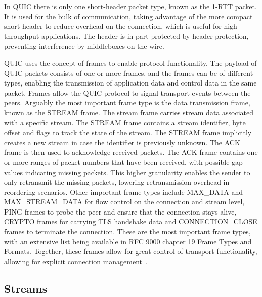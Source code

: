 \documentclass[english, 12pt, a4paper, elec, utf8, a-2b, online]{aaltothesis}
\begin{document}
In QUIC there is only one short-header packet type, known as the 1-RTT packet. It is
used for the bulk of communication, taking advantage of the more compact short
header to reduce overhead on the connection, which is useful for high-throughput
applications. The header is in part protected by header protection, preventing
interference by middleboxes on the wire.

QUIC uses the concept of frames to enable protocol functionality. The payload of
QUIC packets consists of one or more frames, and the frames can be of different types,
enabling the transmission of application data and control data in the same packet. Frames
allow the QUIC protocol to signal transport events between the peers. Arguably the most
important frame type is the data transmission frame, known as the STREAM frame. The stream frame
carries stream data associated with a specific stream. The STREAM frame contains
a stream identifier, byte offset and flags to track the state of the stream. The STREAM
frame implicitly creates a new stream in case the identifier is previously unknown.
The ACK frame is then used to acknowledge received packets. The ACK frame contains
one or more ranges of packet numbers that have been received, with possible gap values
indicating missing packets. This higher granularity enables the sender to only retransmit
the missing packets, lowering retransmission overhead in reordering scenarios. Other
important frame types include MAX\_DATA and MAX\_STREAM\_DATA for flow control
on the connection and stream level, PING frames to probe the peer and ensure that
the connection stays alive, CRYPTO frames for carrying TLS handshake data and CONNECTION\_CLOSE frames
to terminate the connection. These are the most important frame types, with an
extensive list being available in RFC 9000 chapter 19 Frame Types and Formats. Together,
these frames allow for great control of transport functionality, allowing for explicit
connection management~\cite{rfc9000}.

\subsection{Streams}
\end{document}
